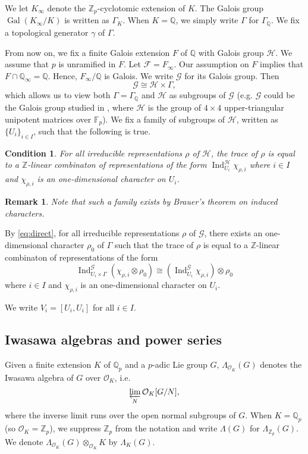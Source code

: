 \documentclass{amsart}
\newtheorem{remark}[theorem]{Remark}
\newtheorem{condition}[theorem]{Condition}
\begin{document}
We let $K_\infty$ denote the ${{\mathbb Z}_p}$-cyclotomic extension of $K$. The Galois group $\operatorname{Gal}(K_\infty/K)$ is written as $\Gamma_K$. When $K={\mathbb Q}$, we simply write $\Gamma$ for $\Gamma_{\mathbb Q}$. We fix a topological generator $\gamma$ of $\Gamma$.

 From now on, we fix a finite Galois extension $F$ of ${\mathbb Q}$ with Galois group ${\mathcal{H}}$. We assume that $p$ is unramified in $F$. Let ${\mathcal{F}}=F_\infty$. Our assumption on $F$ implies that $F\cap{\mathbb Q}_\infty={\mathbb Q}$. Hence, $F_\infty/{\mathbb Q}$ is Galois. We write ${\mathcal{G}}$ for its Galois group. Then
 \begin{equation}\label{eq:direct}
 {\mathcal{G}}\cong{\mathcal{H}}\times\Gamma,
 \end{equation}
 which allows us to view both $\Gamma=\Gamma_{\mathbb Q}$ and ${\mathcal{H}}$ as subgroups of ${\mathcal{G}}$ (e.g. ${\mathcal{G}}$ could be the Galois group studied in \cite{hara}, where ${\mathcal{H}}$ is the group of $4\times4$ upper-triangular unipotent matrices over ${\mathbb F}_p$). We fix a family of subgroups of ${\mathcal{H}}$, written as $\{U_i\}_{i\in I}$, such that the following is true.
 \begin{condition}\label{hyp:family}
 For all irreducible representations $\rho$ of ${\mathcal{H}}$, the trace of $\rho$ is equal to a ${\mathbb Z}$-linear combinaton of representations of the form $\operatorname{Ind}_{U_i}^{\mathcal{H}}\chi_{\rho,i}$ where $i\in I$ and $\chi_{\rho,i}$ is an one-dimensional character on $U_i$.
 \end{condition}
\begin{remark}Note that such a family exists by Brauer's theorem on induced characters.\end{remark}

By \eqref{eq:direct}, for all irreducible representations $\rho$ of ${\mathcal{G}}$, there exists an one-dimensional character $\rho_0$ of $\Gamma$ such that the trace of $\rho$ is equal to a ${\mathbb Z}$-linear combinaton of representations of the form 
\[
\operatorname{Ind}_{U_i\times\Gamma}^{\mathcal{G}}(\chi_{\rho,i}\otimes\rho_0)\cong\left(\operatorname{Ind}_{U_i}^{\mathcal{G}}\chi_{\rho,i}\right)\otimes\rho_0
\]
 where $i\in I$ and $\chi_{\rho,i}$ is an one-dimensional character on $U_i$.
  
  We write $V_i=[U_i,U_i]$ for all $i\in I$.

\subsection{Iwasawa algebras and power series}
 Given a finite extension $K$ of ${{\mathbb Q}_p}$ and a $p$-adic Lie group $G$, $\Lambda_{{\mathcal{O}}_K}(G)$ denotes the Iwasawa algebra of $G$ over ${\mathcal{O}}_K$, i.e.
 \[
  \varprojlim_{N}{\mathcal{O}}_K[G/N], 
 \] 
 where the inverse limit runs over the open normal subgroups of $G$. When $K={{\mathbb Q}_p}$ (so ${\mathcal{O}}_K={{\mathbb Z}_p}$), we suppress ${{\mathbb Z}_p}$ from the notation and write $\Lambda(G)$ for $\Lambda_{{\mathbb Z}_p}(G)$. We denote $\Lambda_{{\mathcal{O}}_K}(G)\otimes_{{\mathcal{O}}_K} K$ by $\Lambda_K(G)$.
\end{document}
